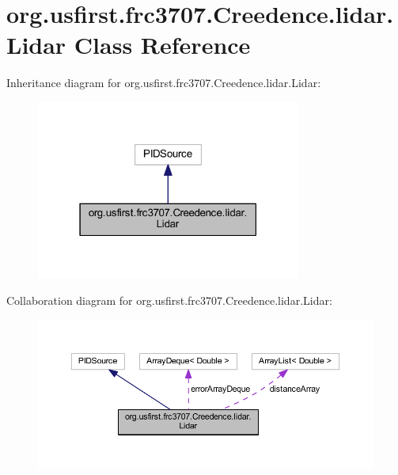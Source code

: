 \hypertarget{classorg_1_1usfirst_1_1frc3707_1_1_creedence_1_1lidar_1_1_lidar}{}\section{org.\+usfirst.\+frc3707.\+Creedence.\+lidar.\+Lidar Class Reference}
\label{classorg_1_1usfirst_1_1frc3707_1_1_creedence_1_1lidar_1_1_lidar}


Inheritance diagram for org.\+usfirst.\+frc3707.\+Creedence.\+lidar.\+Lidar\+:
\nopagebreak
\begin{figure}[H]
\begin{center}
\leavevmode
\includegraphics[width=247pt]{classorg_1_1usfirst_1_1frc3707_1_1_creedence_1_1lidar_1_1_lidar__inherit__graph}
\end{center}
\end{figure}


Collaboration diagram for org.\+usfirst.\+frc3707.\+Creedence.\+lidar.\+Lidar\+:
\nopagebreak
\begin{figure}[H]
\begin{center}
\leavevmode
\includegraphics[width=350pt]{classorg_1_1usfirst_1_1frc3707_1_1_creedence_1_1lidar_1_1_lidar__coll__graph}
\end{center}
\end{figure}
